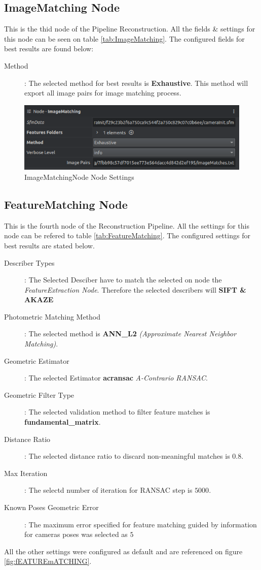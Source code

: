 \documentclass[12pt]{report}
\begin{document}
\subsection*{ImageMatching Node}
This is the thid node of the Pipeline Reconstruction. All the fields \& settings for this node can be seen on table \ref{tab:ImageMatching}.
The configured fields for best results are found below: 

\begin{description}
  \item[Method]: The selected method for best results is \textbf{Exhaustive}. This method will export all image pairs for image matching process.  
\end{description}

\begin{figure}[H]%
  \centering
 \includegraphics[width=1\textwidth]{ImageMatchingNode.png}
\caption{ImageMatchingNode Node Settings}
\label{fig:ImageMatchingNode._node} 
\end{figure}

\subsection*{FeatureMatching Node}
This is the fourth node of the Reconstruction Pipeline. All the settings for this node can be refered to table \ref{tab:FeatureMatching}.
The configured settings for best results are stated below. 

\begin{description}
  \item[Describer Types]: The Selected Desciber have to  match the selected on node the \textit{FeatureExtraction Node}. Therefore the selected describers will \textbf{SIFT \& AKAZE}
  \item[Photometric Matching Method]: The selected method is \textbf{ANN\_L2} \textit{(Approximate Nearest Neighbor Matching)}.
  \item[Geometric Estimator]: The selected Estimator \textbf{acransac}  \textit{A-Contrario RANSAC}.
  \item[Geometric Filter Type]: The selected validation method to filter feature matches is \textbf{fundamental\_matrix}.
  \item[Distance Ratio]: The selected distance ratio to discard non-meaningful matches  is $0.8$.
  \item[Max Iteration]: The selectd number of iteration for RANSAC step is $5000$.
  \item[Known Poses Geometric Error] : The maximum error specified for feature matching guided by information for cameras poses was selected as $5$
\end{description}
All the other settings were configured as default and are referenced on figure \ref{fig:fEATUREmATCHING}.
\end{document}
